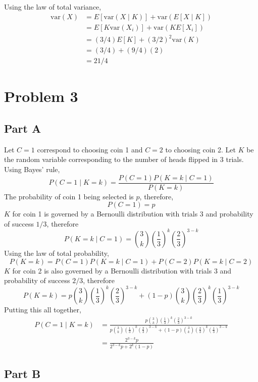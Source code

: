 \documentclass{article}
\begin{document}
Using the law of total variance,
\begin{align*}
  \mathrm{var}(X) &= E[\mathrm{var}(X \mid K)] + \mathrm{var}(E[X \mid K]) \\
  &= E[K \mathrm{var}(X_i)] + \mathrm{var}(K E[X_i]) \\
  &= (3 / 4) E[K] + (3 / 2)^2 \mathrm{var}(K) \\
  &= (3 / 4) + (9 / 4)(2) \\
  &= 21 / 4
\end{align*}

\section*{Problem 3}

\subsection*{Part A}

Let $C = 1$ correspond to choosing coin 1 and $C = 2$ to choosing coin 2. Let
$K$ be the random variable corresponding to the number of heads flipped in
$3$ trials. Using Bayes' rule,
$$ P(C = 1 \mid K = k) = \frac{P(C = 1) P(K = k \mid C = 1)}{P(K = k)} $$
The probability of coin 1 being selected is $p$, therefore,
$$ P(C = 1) = p $$
$K$ for coin 1 is governed by a Bernoulli distribution with trials $3$ and
probability of success $1/3$, therefore
$$ P(K = k \mid C = 1) = \binom{3}{k} \left(\frac{1}{3}\right)^k
\left(\frac{2}{3}\right)^{3 - k} $$
Using the law of total probability,
$$ P(K = k) = P(C = 1) P(K = k \mid C = 1) + P(C = 2) P(K = k \mid C = 2) $$
$K$ for coin 2 is also governed by a Bernoulli distribution with trials $3$
and probability of success $2/3$, therefore
$$ P(K = k) = p \binom{3}{k} \left(\frac{1}{3}\right)^k
\left(\frac{2}{3}\right)^{3 - k} + (1 - p) \binom{3}{k}
\left(\frac{2}{3}\right)^k \left(\frac{1}{3}\right)^{3 - k} $$
Putting this all together,
\begin{align*}
  P(C = 1 \mid K = k) &= \frac{p \binom{3}{k} \left(\frac{1}{3}\right)^k
  \left(\frac{2}{3}\right)^{3 - k}}{p \binom{3}{k} \left(\frac{1}{3}\right)^k
  \left(\frac{2}{3}\right)^{3 - k} + (1 - p) \binom{3}{k}
  \left(\frac{2}{3}\right)^k \left(\frac{1}{3}\right)^{3 - k}} \\
  &= \frac{2^{3 - k} p }{2^{3 - k} p + 2^k(1 - p)}
\end{align*}

\subsection*{Part B}
\end{document}
